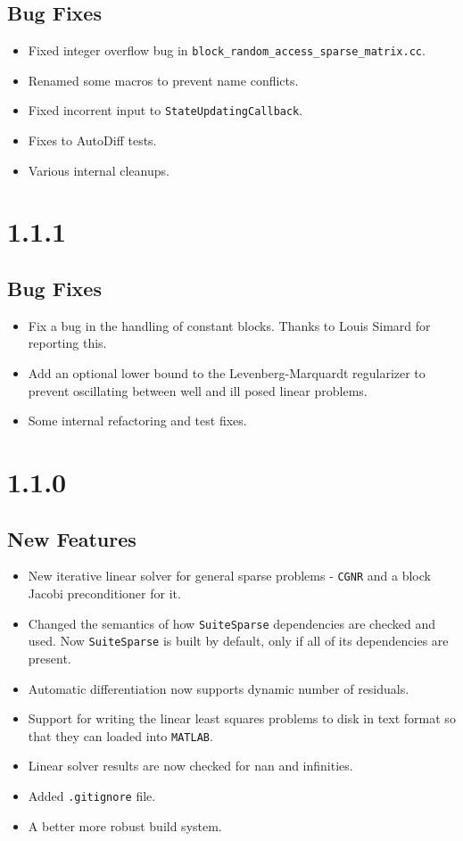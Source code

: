 \subsection{Bug Fixes}
\begin{itemize}
\item Fixed integer overflow bug in \texttt{block\_random\_access\_sparse\_matrix.cc}.
\item Renamed some macros to prevent name conflicts.
\item Fixed incorrent input to \texttt{StateUpdatingCallback}.
\item Fixes to AutoDiff tests.
\item Various internal cleanups.
\end{itemize}

\section*{1.1.1}
\subsection{Bug Fixes}
\begin{itemize}
\item Fix a bug in the handling of constant blocks. Thanks to Louis Simard for reporting this.
\item Add an optional lower bound to the Levenberg-Marquardt regularizer to prevent oscillating between well and ill posed linear problems.
\item Some internal refactoring and test fixes.
\end{itemize}
\section{1.1.0}
\subsection{New Features}
\begin{itemize}
\item New iterative linear solver for general sparse problems - \texttt{CGNR} and a block Jacobi preconditioner for it.
\item Changed the semantics of how \texttt{SuiteSparse} dependencies are checked and used. Now \texttt{SuiteSparse} is built by default, only if all of its dependencies are present.
\item Automatic differentiation now supports dynamic number of residuals.
\item Support for writing the linear least squares problems to disk in text format so that they can loaded into \texttt{MATLAB}.
\item Linear solver results are now checked for nan and infinities.
\item Added \texttt{.gitignore} file.
\item A better more robust build system.
\end{itemize}

